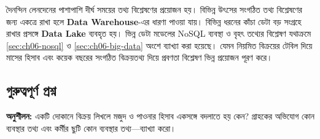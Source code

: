 দৈনন্দিন লেনদেনের পাশাপাশি দীর্ঘ সময়ের তথ্য বিশ্লেষণের প্রয়োজন হয়। বিভিন্ন উৎসের সংগঠিত তথ্য বিশ্লেষণের জন্য একত্রে রাখা হলে \textbf{Data Warehouse}-এর ধারণা পাওয়া যায়। বিভিন্ন ধরনের কাঁচা ডেটা বড় সংগ্রহে রাখার প্রসঙ্গে \textbf{Data Lake} ব্যবহৃত হয়। ভিন্ন ডেটা মডেলের NoSQL ব্যবস্থা ও বৃহৎ তথ্যের বিশ্লেষণ যথাক্রমে \ref{sec:ch06-nosql} ও \ref{sec:ch06-big-data} অংশে ব্যাখ্যা করা হয়েছে। যেমন নিয়মিত বিক্রয়ের টেবিল দিয়ে মাসের হিসাব এবং কয়েক বছরের সংগঠিত বিক্রয়তথ্য দিয়ে প্রবণতা বিশ্লেষণ ভিন্ন প্রয়োজন পূরণ করে।

\subsection{গুরুত্বপূর্ণ প্রশ্ন}
\textbf{অনুশীলন:} একটি দোকানে বিক্রয় লিখলে মজুদ ও পাওনার হিসাব একসঙ্গে বদলাতে হয় কেন? গ্রাহকের অভিযোগ কোন ব্যবস্থার তথ্য এবং কর্মীর ছুটি কোন ব্যবস্থার তথ্য---ব্যাখ্যা করো।


